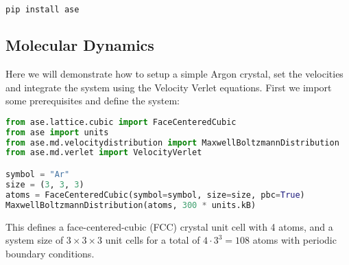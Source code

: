 \begin{lstlisting}[language=bash]
pip install ase
\end{lstlisting}

\subsection{Molecular Dynamics}
Here we will demonstrate how to setup a simple Argon crystal,
set the velocities and integrate the system using
the Velocity Verlet equations.
First we import some prerequisites and define the system:

\begin{lstlisting}[language=python,basicstyle=\small]
from ase.lattice.cubic import FaceCenteredCubic
from ase import units
from ase.md.velocitydistribution import MaxwellBoltzmannDistribution
from ase.md.verlet import VelocityVerlet

symbol = "Ar"
size = (3, 3, 3)
atoms = FaceCenteredCubic(symbol=symbol, size=size, pbc=True)
MaxwellBoltzmannDistribution(atoms, 300 * units.kB)
\end{lstlisting}

This defines a face-centered-cubic (FCC) crystal unit cell
with 4 atoms, and a system size of $3\times3\times3$ unit cells
for a total of $4\cdot3^3 = 108$ atoms with periodic boundary conditions.
